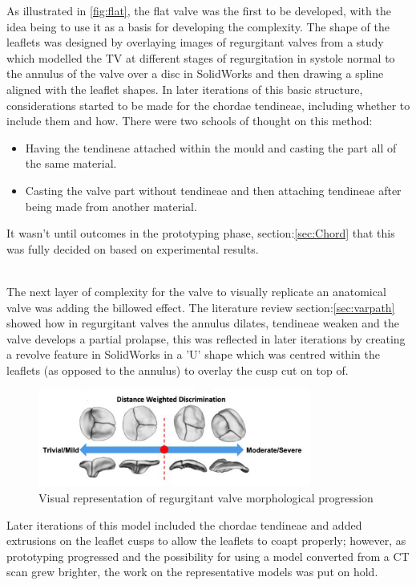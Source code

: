 As illustrated in \cref{fig:flat}, the flat valve was the first to be developed, with the idea being to use it as a basis for developing the complexity. The shape of the leaflets was designed by overlaying images of regurgitant valves from a study which modelled the \gls{TV} at different stages of regurgitation  in systole normal to the annulus of the valve over a disc in SolidWorks and then drawing a spline aligned with the leaflet shapes.
In later iterations of this basic structure, considerations started to be made for the chordae tendineae, including whether to include them and how. There were two schools of thought on this method:
\begin{itemize}
    \item Having the tendineae attached within the mould and casting the part all of the same material.
    \item Casting the valve part without tendineae and then attaching tendineae after being made from another material.
\end{itemize}
It wasn't until outcomes in the prototyping phase, section:\cref{sec:Chord} that this was fully decided on based on experimental results.

\\
The next layer of complexity for the valve to visually replicate an anatomical valve was adding the billowed effect.
The literature review section:\cref{sec:varpath} showed how in regurgitant valves the annulus dilates, tendineae weaken and the valve develops a partial prolapse, this was reflected in later iterations by creating a revolve feature in SolidWorks in a 'U' shape which was centred within the leaflets (as opposed to the annulus) to overlay the cusp cut on top of.
\begin{figure}
    \centering
    \includegraphics[width=0.8\textwidth]{figures/billow}
    \caption{Visual representation of regurgitant valve morphological progression }
    \label{fig:bill}
\end{figure}
Later iterations of this model included the chordae tendineae and added extrusions on the leaflet cusps to allow the leaflets to coapt properly; however, as prototyping progressed and the possibility for using a model converted from a \gls{CT} scan grew brighter, the work on the representative models was put on hold.


